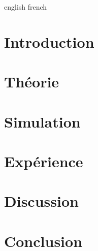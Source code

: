 \documentclass[a4paper,12pt,oneside]{article}
\begin{document}
\def\en{english}
\def\fr{french}
\ifx\en\langparam
	\def\Theory{Theory}
	\def\Experiment{Experiment}
\fi
\ifx\fr\langparam
	\def\Theory{Théorie}
	\def\Experiment{Expérience}
\fi




\newpage
\section{Introduction}


\newpage
\section{\Theory}


\newpage
\section{Simulation}


\newpage
\section{\Experiment}


\newpage
\section{Discussion}


\newpage
\section{Conclusion}


\medskip
 


\end{document}
